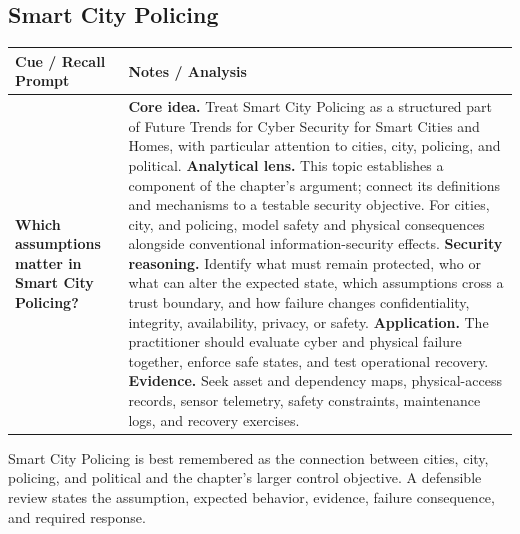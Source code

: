 \documentclass[11pt]{article}
\newcommand{\CornellHeader}{%
\rowcolor{Navy}\color{white}\bfseries Cue / Recall Prompt & \color{white}\bfseries Notes / Analysis\\\hline}
\newcommand{\CornellRow}[2]{%
\cellcolor{CueGray}\RaggedRight\textbf{#1} & \RaggedRight #2\\\hline}
\begin{document}
\subsection*{Smart City Policing}
\begin{longtable}{>{\RaggedRight\arraybackslash}p{}|>{\RaggedRight\arraybackslash}p{}}
\CornellHeader
\CornellRow{Which assumptions matter in Smart City Policing?}{\textbf{Core idea.} Treat Smart City Policing as a structured part of Future Trends for Cyber Security for Smart Cities and Homes, with particular attention to cities, city, policing, and political. \textbf{Analytical lens.} This topic establishes a component of the chapter's argument; connect its definitions and mechanisms to a testable security objective. For cities, city, and policing, model safety and physical consequences alongside conventional information-security effects. \textbf{Security reasoning.} Identify what must remain protected, who or what can alter the expected state, which assumptions cross a trust boundary, and how failure changes confidentiality, integrity, availability, privacy, or safety. \textbf{Application.} The practitioner should evaluate cyber and physical failure together, enforce safe states, and test operational recovery. \textbf{Evidence.} Seek asset and dependency maps, physical-access records, sensor telemetry, safety constraints, maintenance logs, and recovery exercises.}
\end{longtable}
\begin{topicsummary}
Smart City Policing is best remembered as the connection between cities, city, policing, and political and the chapter's larger control objective. A defensible review states the assumption, expected behavior, evidence, failure consequence, and required response.
\end{topicsummary}
\end{document}
